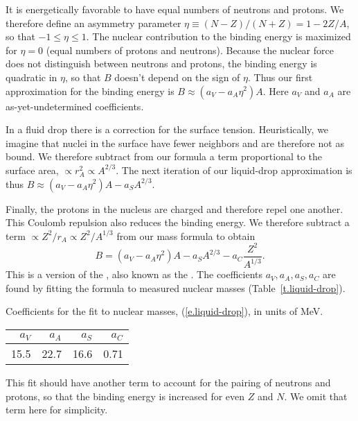 It is energetically favorable to have equal numbers of neutrons and protons. We therefore define an asymmetry parameter $\eta \equiv (N-Z)/(N+Z) = 1-2Z/A$, so that $-1\le\eta\le1$. The nuclear contribution to the binding energy is maximized for $\eta = 0$ (equal numbers of protons and neutrons). Because the nuclear force does not distinguish between neutrons and protons, the binding energy is quadratic in $\eta$, so that $B$ doesn't depend on the sign of $\eta$. Thus our first approximation for the binding energy is $B \approx (a_{V} - a_{A}\eta^{2}) A$. Here $a_{V}$ and $a_{A}$ are as-yet-undetermined coefficients.

In a fluid drop there is a correction for the surface tension. Heuristically, we imagine that nuclei in the surface have fewer neighbors and are therefore not as bound. We therefore subtract from our formula a term proportional to the surface area, $\propto r_{A}^{2} \propto A^{2/3}$. The next iteration of our liquid-drop approximation is thus $B \approx (a_{V}- a_{A}\eta^{2})A - a_{S}A^{2/3} $.

Finally, the protons in the nucleus are charged and therefore repel one another. This Coulomb repulsion also reduces the binding energy. We therefore subtract a term $\propto Z^{2}/r_{A}\propto Z^{2}/A^{1/3}$ from our mass formula to obtain
\begin{equation}\label{e.liquid-drop}
B = \left(a_{V} -a_{A}\eta^{2}\right) A -  a_{S}A^{2/3} - a_{C} \frac{Z^{2}}{A^{1/3}}. 
\end{equation}
This is a version of the , also known as the .
The coefficients $a_{V},a_{A},a_{S},a_{C}$ are found by fitting the formula to measured nuclear masses (Table~\ref{t.liquid-drop}).
\begin{margintable}
\caption[Liquid-drop coefficients]{\label{t.liquid-drop} Coefficients for the fit to nuclear masses, (\protect\ref{e.liquid-drop}), in units of MeV.}
\begin{tabular}{rrrr}
$a_V$ & $a_A$ & $a_S$ & $a_C$ \\
\hline
15.5 & 22.7 & 16.6 & 0.71\\
\end{tabular}
\end{margintable}
\noindent This fit should have another term to account for the pairing of neutrons and protons, so that the binding energy is increased for even $Z$ and $N$. We omit that term here for simplicity.

